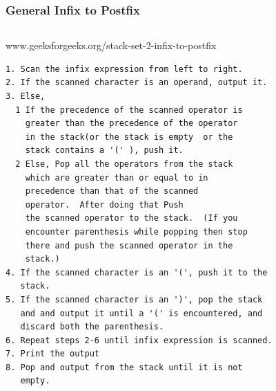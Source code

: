 \begin{frame}[fragile]
\frametitle{General Infix to Postfix}
\begin{columns}[T]

\begin{column}{0.45\textwidth}
{\footnotesize
www.geeksforgeeks.org/stack-set-2-infix-to-postfix
}

{\tiny
\begin{verbatim}
1. Scan the infix expression from left to right. 
2. If the scanned character is an operand, output it. 
3. Else, 
  1 If the precedence of the scanned operator is
    greater than the precedence of the operator
    in the stack(or the stack is empty  or the
    stack contains a '(' ), push it. 
  2 Else, Pop all the operators from the stack
    which are greater than or equal to in
    precedence than that of the scanned
    operator.  After doing that Push
    the scanned operator to the stack.  (If you
    encounter parenthesis while popping then stop
    there and push the scanned operator in the
    stack.) 
4. If the scanned character is an '(', push it to the
   stack. 
5. If the scanned character is an ')', pop the stack
   and and output it until a '(' is encountered, and
   discard both the parenthesis. 
6. Repeat steps 2-6 until infix expression is scanned. 
7. Print the output 
8. Pop and output from the stack until it is not
   empty.
\end{verbatim}
}
\end{column}


\end{columns}
\end{frame}
